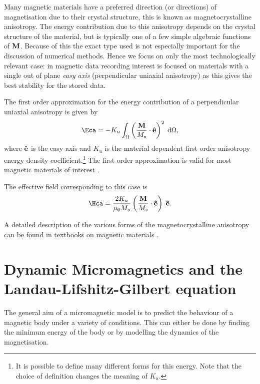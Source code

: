 Many magnetic materials have a preferred direction (or directions) of magnetisation due to their crystal structure, this is known as magnetocrystalline anisotropy.
The energy contribution due to this anisotropy depends on the crystal structure of the material, but is typically one of a few simple algebraic functions of $\mathbf{M}$.
Because of this the exact type used is not especially important for the discussion of numerical methods.
Hence we focus on only the most technologically relevant case: in magnetic data recording interest is focused on materials with a single out of plane \emph{easy axis} (perpendicular uniaxial anisotropy) as this gives the best stability for the stored data.

The first order approximation for the energy contribution of a perpendicular uniaxial anisotropy is given by
\begin{equation}
  \Eca = -K_u \int_\magd \left( \frac{\Mv}{M_s} \cdot \ev \right)^2 \d \magd,
  \label{eq:36}
\end{equation}
where $\mathbf{\hat{e}}$ is the easy axis and $K_u$ is the material dependent first order anisotropy energy density coefficient.\footnote{It is possible to define many different forms for this energy. Note that the choice of definition changes the meaning of $K_u$.}
The first order approximation is valid for most magnetic materials of interest \cite{Kronmuller2003}.

The effective field corresponding to this case is
\begin{equation}
  \Hca = \frac{2 K_u}{\mu_0 M_s} \left( \frac{\Mv}{M_s} \cdot \ev \right) \; \ev.
  \label{eq:Hca}
\end{equation}

A detailed description of the various forms of the magnetocrystalline anisotropy can be found in textbooks on magnetic materials \cite{Coey2010}\cite{Aharoni1996}.



\section{Dynamic Micromagnetics and the Landau-Lifshitz-Gilbert equation}
\label{sec:land-lifsch-gilb}

The general aim of a micromagnetic model is to predict the behaviour of a magnetic body under a variety of conditions.
This can either be done by finding the minimum energy of the body or by modelling the dynamics of the magnetisation.

